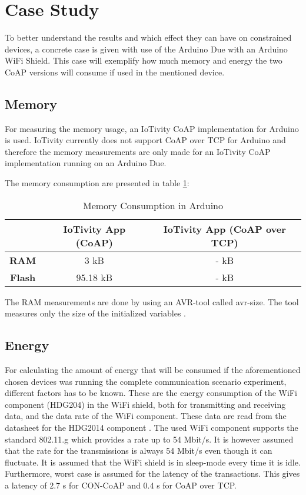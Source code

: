\section{Case Study} \label{sec:casestudy}
To better understand the results and which effect they can have on constrained devices, a concrete case is given with use of the Arduino Due with an Arduino WiFi Shield. This case will exemplify how much memory and energy the two CoAP versions will consume if used in the mentioned device.

\subsection{Memory}
For measuring the memory usage, an IoTivity CoAP implementation for Arduino is used. IoTivity currently does not support CoAP over TCP for Arduino and therefore the memory measurements are only made for an IoTivity CoAP implementation running on an Arduino Due.
 
The memory consumption are presented in table \ref{tab:memory}:
\begin{table}[bht]
	\renewcommand{\arraystretch}{1.3}
	\caption{Memory Consumption in Arduino}
	\label{tab:memory}
	\centering
	\begin{tabular}{|c|c|c|}
		\hline
		\bfseries  & \bfseries IoTivity App (CoAP) & \bfseries IoTivity App (CoAP over TCP) \\
		\hline
		\textbf{RAM} & 3 kB & - kB \\
		\hline
		\textbf{Flash} & 95.18 kB & - kB \\
		\hline
	\end{tabular}
\end{table}

The RAM measurements are done by using an AVR-tool called avr-size. The tool measures only the size of the initialized variables \cite{Check55:online}.

\subsection{Energy}
For calculating the amount of energy that will be consumed if the aforementioned chosen devices was running the complete communication scenario experiment, different factors has to be known. These are the energy consumption of the WiFi component (HDG204) in the WiFi shield, both for transmitting and receiving data, and the data rate of the WiFi component. These data are read from the datasheet for the HDG2014 component \cite{hdg204:datasheet}. The used WiFi component supports the standard 802.11.g which provides a rate up to 54 Mbit/s. It is however assumed that the rate for the transmissions is always 54 Mbit/s even though it can fluctuate. 
It is assumed that the WiFi shield is in sleep-mode every time it is idle. Furthermore, worst case is assumed for the latency of the transactions. This gives a latency of 2.7 s for CON-CoAP and 0.4 s for CoAP over TCP.


